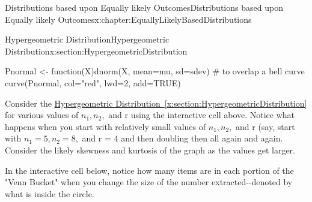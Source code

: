 \documentclass[oneside,10pt,]{book}
\newcommand{\xreffont}{\relax}
\numberwithin{equation}{section}
\begin{document}
\begin{chapterptx}{Distributions based upon Equally likely Outcomes}{}{Distributions based upon Equally likely Outcomes}{}{}{x:chapter:EquallyLikelyBasedDistributions}
\begin{sectionptx}{Hypergeometric Distribution}{}{Hypergeometric Distribution}{}{}{x:section:HypergeometricDistribution}
\begin{sageinput}
Pnormal <- function(X){dnorm(X, mean=mu, sd=sdev)}   # to overlap a bell curve
curve(Pnormal, col="red", lwd=2, add=TRUE)
\end{sageinput}
%
\par
Consider the \hyperref[x:section:HypergeometricDistribution]{Hypergeometric Distribution~{\xreffont\ref{x:section:HypergeometricDistribution}}} for various values of \(n_1, n_2,\) and r using the interactive cell above. Notice what happens when you start with relatively small values of \(n_1, n_2,\) and r (say, start with \(n_1 = 5, n_2 = 8,\) and r = 4 and then doubling then all again and again. Consider the likely skewness and kurtosis of the graph as the values get larger.%
\par
In the interactive cell below, notice how many items are in each portion of the "Venn Bucket" when you change the size of the number extracted-{}-{}denoted by what is inside the circle.%
\end{sectionptx}
%
%
\typeout{************************************************}

\end{chapterptx}
\end{document}
